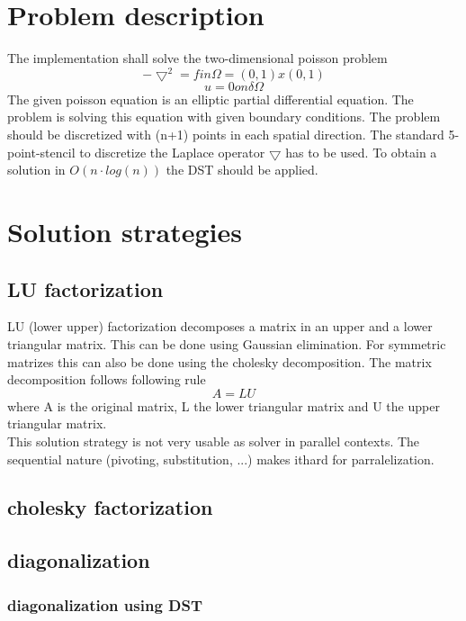 \documentclass{article}
\begin{document}
\section{Problem description}
The implementation shall solve the two-dimensional poisson problem 
\begin{equation}
-\bigtriangledown^2=f in \Omega = (0,1)x(0,1)
\end{equation}
\begin{equation}
u = 0 on \delta\Omega
\end{equation}
The given poisson equation is an elliptic partial differential equation. The problem is solving this equation with given boundary conditions. 
The problem should be discretized with (n+1) points in each spatial direction. The standard 5-point-stencil to discretize the Laplace operator $\bigtriangledown$ has to be used. To obtain a solution in $O(n\cdot log(n))$ the DST should be applied.
\section{Solution strategies}
\subsection{LU factorization}
LU (lower upper) factorization decomposes a matrix in an upper and a lower triangular matrix. This can be done using Gaussian elimination. For symmetric matrizes this can also be done using the cholesky decomposition. The matrix decomposition follows following rule
\begin{equation}
A=LU
\end{equation}
where A is the original matrix, L the lower triangular matrix and U the upper triangular matrix.\\
This solution strategy is not very usable as solver in parallel contexts. The sequential nature (pivoting, substitution, ...) makes ithard for parralelization.
\subsection{cholesky factorization}

\subsection{diagonalization}
\subsubsection{diagonalization using DST}
\end{document}
